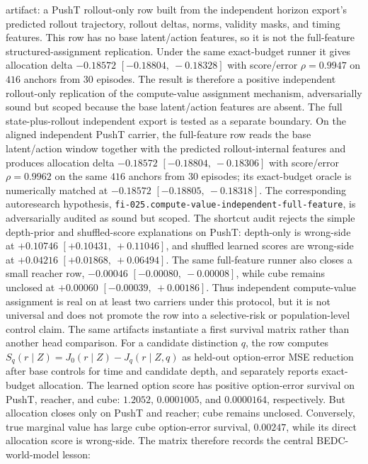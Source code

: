 artifact: a PushT rollout-only row built from the independent horizon export's
predicted rollout trajectory, rollout deltas, norms, validity masks, and timing
features.  This row has no base latent/action features, so it is not the
full-feature structured-assignment replication.  Under the same exact-budget
runner it gives allocation delta $-0.18572$ $[-0.18804,\ -0.18328]$ with
score/error $\rho=0.9947$ on $416$ anchors from $30$ episodes.  The result is
therefore a positive independent rollout-only replication of the compute-value
assignment mechanism, adversarially sound but scoped because the base
latent/action features are absent.  The full state-plus-rollout independent
export is tested as a separate boundary.  On the aligned independent PushT carrier,
the full-feature row reads the base latent/action window together with the
predicted rollout-internal features and produces allocation delta $-0.18572$
$[-0.18804,\ -0.18306]$ with score/error $\rho=0.9962$ on the same $416$
anchors from $30$ episodes; its exact-budget oracle is numerically matched at
$-0.18572$ $[-0.18805,\ -0.18318]$.  The corresponding autoresearch
hypothesis, \texttt{fi-025.compute-value-independent-full-feature}, is
adversarially audited as sound but scoped.  The shortcut audit rejects the
simple depth-prior and shuffled-score explanations on PushT: depth-only is
wrong-side at $+0.10746$ $[+0.10431,\ +0.11046]$, and shuffled learned scores
are wrong-side at $+0.04216$ $[+0.01868,\ +0.06494]$.  The same full-feature
runner also closes a small reacher row, $-0.00046$
$[-0.00080,\ -0.00008]$, while cube remains unclosed at $+0.00060$
$[-0.00039,\ +0.00186]$.  Thus independent compute-value assignment is real
on at least two carriers under this protocol, but it is not universal and does
not promote the row into a selective-risk or population-level control claim.
The same artifacts instantiate a first survival matrix rather than another
head comparison.  For a candidate distinction $q$, the row computes
$S_q(r\mid Z)=J_0(r\mid Z)-J_q(r\mid Z,q)$ as held-out option-error MSE
reduction after base controls for time and candidate depth, and separately
reports exact-budget allocation.  The learned option score has positive
option-error survival on PushT, reacher, and cube: $1.2052$, $0.0001005$, and
$0.0000164$, respectively.  But allocation closes only on PushT and reacher;
cube remains unclosed.  Conversely, true marginal value has large cube
option-error survival, $0.00247$, while its direct allocation score is
wrong-side.  The matrix therefore records the central BEDC-world-model lesson:

